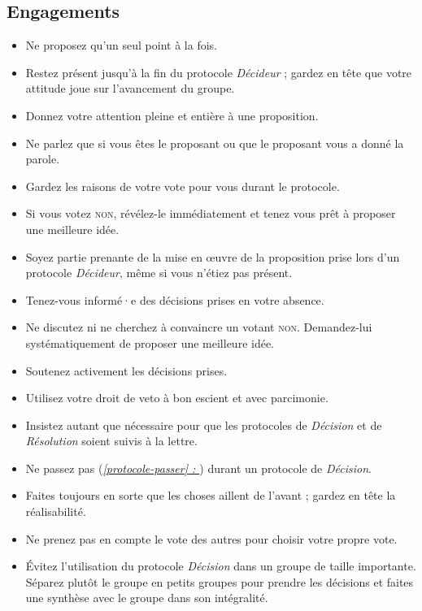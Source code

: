 \documentclass[11pt]{book}
\newcommand*{\fullref}[1]{\textit{\hyperref[{#1}]{\autoref*{#1} : \nameref*{#1}}}}
\begin{document}
\subsection{Engagements}
\begin{itemize}
	\item Ne proposez qu'un seul point à la fois.
	\item Restez présent jusqu'à la fin du protocole \emph{Décideur} ; gardez en tête que votre attitude joue sur l'avancement du groupe.
	\item Donnez votre attention pleine et entière à une proposition.
	\item Ne parlez que si vous êtes le proposant ou que le proposant vous a donné la parole.
	\item Gardez les raisons de votre vote pour vous durant le protocole.
	\item Si vous votez \textsc{non}, révélez-le immédiatement et tenez vous prêt à proposer une meilleure idée.
	\item Soyez partie prenante de la mise en œuvre de la proposition prise lors d'un protocole \emph{Décideur}, même si vous n'étiez pas présent.
	\item Tenez-vous informé·e des décisions prises en votre absence.
	\item Ne discutez ni ne cherchez à convaincre un votant \textsc{non}. Demandez-lui systématiquement de proposer une meilleure idée.
	\item Soutenez activement les décisions prises.
	\item Utilisez votre droit de veto à bon escient et avec parcimonie.
	\item Insistez autant que nécessaire pour que les protocoles de \emph{Décision} et de \emph{Résolution} soient suivis à la lettre.
	\item Ne passez pas (\fullref{protocole-passer}) durant un protocole de \emph{Décision}.
	\item Faites toujours en sorte que les choses aillent de l'avant ; gardez en tête la réalisabilité.
	\item Ne prenez pas en compte le vote des autres pour choisir votre propre vote.
	\item Évitez l'utilisation du protocole \emph{Décision} dans un groupe de taille importante. Séparez plutôt le groupe en petits groupes pour prendre les
	      décisions et faites une synthèse avec le groupe dans son intégralité.
\end{itemize}
\end{document}
